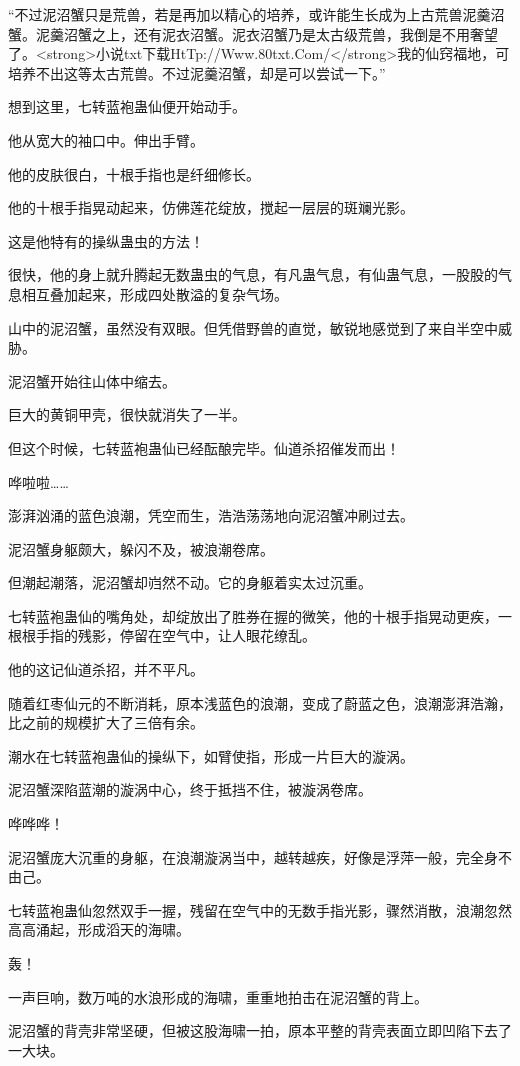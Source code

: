 \begin{this_body}
“不过泥沼蟹只是荒兽，若是再加以精心的培养，或许能生长成为上古荒兽泥羹沼蟹。泥羹沼蟹之上，还有泥衣沼蟹。泥衣沼蟹乃是太古级荒兽，我倒是不用奢望了。<strong>小说txt下载HtTp://Www.80txt.Com/</strong>我的仙窍福地，可培养不出这等太古荒兽。不过泥羹沼蟹，却是可以尝试一下。”

想到这里，七转蓝袍蛊仙便开始动手。

他从宽大的袖口中。伸出手臂。

他的皮肤很白，十根手指也是纤细修长。

他的十根手指晃动起来，仿佛莲花绽放，搅起一层层的斑斓光影。

这是他特有的操纵蛊虫的方法！

很快，他的身上就升腾起无数蛊虫的气息，有凡蛊气息，有仙蛊气息，一股股的气息相互叠加起来，形成四处散溢的复杂气场。

山中的泥沼蟹，虽然没有双眼。但凭借野兽的直觉，敏锐地感觉到了来自半空中威胁。

泥沼蟹开始往山体中缩去。

巨大的黄铜甲壳，很快就消失了一半。

但这个时候，七转蓝袍蛊仙已经酝酿完毕。仙道杀招催发而出！

哗啦啦……

澎湃汹涌的蓝色浪潮，凭空而生，浩浩荡荡地向泥沼蟹冲刷过去。

泥沼蟹身躯颇大，躲闪不及，被浪潮卷席。

但潮起潮落，泥沼蟹却岿然不动。它的身躯着实太过沉重。

七转蓝袍蛊仙的嘴角处，却绽放出了胜券在握的微笑，他的十根手指晃动更疾，一根根手指的残影，停留在空气中，让人眼花缭乱。

他的这记仙道杀招，并不平凡。

随着红枣仙元的不断消耗，原本浅蓝色的浪潮，变成了蔚蓝之色，浪潮澎湃浩瀚，比之前的规模扩大了三倍有余。

潮水在七转蓝袍蛊仙的操纵下，如臂使指，形成一片巨大的漩涡。

泥沼蟹深陷蓝潮的漩涡中心，终于抵挡不住，被漩涡卷席。

哗哗哗！

泥沼蟹庞大沉重的身躯，在浪潮漩涡当中，越转越疾，好像是浮萍一般，完全身不由己。

七转蓝袍蛊仙忽然双手一握，残留在空气中的无数手指光影，骤然消散，浪潮忽然高高涌起，形成滔天的海啸。

轰！

一声巨响，数万吨的水浪形成的海啸，重重地拍击在泥沼蟹的背上。

泥沼蟹的背壳非常坚硬，但被这股海啸一拍，原本平整的背壳表面立即凹陷下去了一大块。


\end{this_body}
